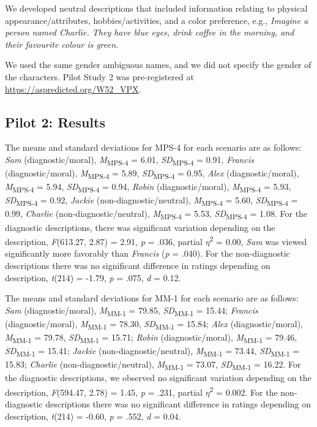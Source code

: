 \documentclass[
  american,
  man,floatsintext]{apa7}
\begin{document}
We developed neutral descriptions that included information relating to physical appearance/attributes, hobbies/activities, and a color preference, e.g., \emph{Imagine a person named Charlie. They have blue eyes, drink coffee in the morning, and their favourite colour is green}.

We used the same gender ambiguous names, and we did not specify the gender of the characters. Pilot Study 2 was pre-registered at \color{blue}\url{https://aspredicted.org/W52_VPX}\color{black}.

\hypertarget{pilot-2-results}{%
\subsection{Pilot 2: Results}\label{pilot-2-results}}

The means and standard deviations for MPS-4 for each scenario are as follows:
\emph{Sam} (diagnostic/moral),
\emph{M}\textsubscript{MPS-4} = 6.01, \emph{SD}\textsubscript{MPS-4} = 0.91,
\emph{Francis} (diagnostic/moral),
\emph{M}\textsubscript{MPS-4} = 5.89, \emph{SD}\textsubscript{MPS-4} = 0.95,
\emph{Alex} (diagnostic/moral),
\emph{M}\textsubscript{MPS-4} = 5.94, \emph{SD}\textsubscript{MPS-4} = 0.94,
\emph{Robin} (diagnostic/moral),
\emph{M}\textsubscript{MPS-4} = 5.93, \emph{SD}\textsubscript{MPS-4} = 0.92,
\emph{Jackie} (non-diagnostic/neutral),
\emph{M}\textsubscript{MPS-4} = 5.60, \emph{SD}\textsubscript{MPS-4} = 0.99,
\emph{Charlie} (non-diagnostic/neutral),
\emph{M}\textsubscript{MPS-4} = 5.53, \emph{SD}\textsubscript{MPS-4} = 1.08. For the diagnostic descriptions, there was significant variation depending on the description, \emph{F}(613.27, 2.87) = 2.91, \emph{p} = .036, partial \(\eta\)\textsuperscript{2} = 0.00, \emph{Sam} was viewed significantly more favorably than \emph{Francis} (\emph{p} = .040). For the non-diagnostic descriptions there was no significant difference in ratings depending on description, \emph{t}(214) = -1.79, \emph{p} = .075, \emph{d} = 0.12.

The means and standard deviations for MM-1 for each scenario are as follows:
\emph{Sam} (diagnostic/moral),
\emph{M}\textsubscript{MM-1} = 79.85, \emph{SD}\textsubscript{MM-1} = 15.44;
\emph{Francis} (diagnostic/moral),
\emph{M}\textsubscript{MM-1} = 78.30, \emph{SD}\textsubscript{MM-1} = 15.84;
\emph{Alex} (diagnostic/moral),
\emph{M}\textsubscript{MM-1} = 79.78, \emph{SD}\textsubscript{MM-1} = 15.71;
\emph{Robin} (diagnostic/moral),
\emph{M}\textsubscript{MM-1} = 79.46, \emph{SD}\textsubscript{MM-1} = 15.41;
\emph{Jackie} (non-diagnostic/neutral),
\emph{M}\textsubscript{MM-1} = 73.44, \emph{SD}\textsubscript{MM-1} = 15.83;
\emph{Charlie} (non-diagnostic/neutral),
\emph{M}\textsubscript{MM-1} = 73.07, \emph{SD}\textsubscript{MM-1} = 16.22. For the diagnostic descriptions, we observed no significant variation depending on the description, \emph{F}(594.47, 2.78) = 1.45, \emph{p} = .231, partial \(\eta\)\textsuperscript{2} = 0.002. For the non-diagnostic descriptions there was no significant difference in ratings depending on description, \emph{t}(214) = -0.60, \emph{p} = .552, \emph{d} = 0.04.
\end{document}
